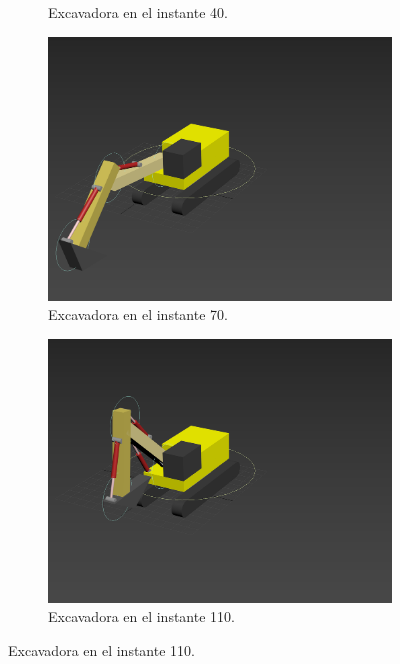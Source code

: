 \begin{figure}[H]
\begin{subfigure}[t]{0.48\textwidth}
        \caption{Excavadora en el instante 40.}
    \end{subfigure}
    \par\bigskip
	\begin{subfigure}[t]{0.48\textwidth}
	    \centering
	    \includegraphics[width=\textwidth]{imagenes/animacion/70.png}
        \caption{Excavadora en el instante 70.}
    \end{subfigure}        
    \hfill
	\begin{subfigure}[t]{0.48\textwidth}
	    \centering
	    \includegraphics[width=\textwidth]{imagenes/animacion/110.png}
        \caption{Excavadora en el instante 110.}
    \end{subfigure}

\end{figure}
